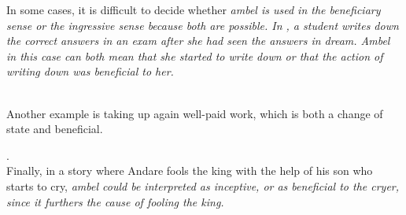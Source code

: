 In some cases, it is difficult to decide whether \em ambel \em is used in the beneficiary sense or the ingressive sense because both are possible.
In , a student writes down the correct answers in an exam after she had seen the answers in dream. \em Ambel \em in this case can both mean that she started to write down or that the action of writing down was beneficial to her.


 \\

Another example is taking up again well-paid work, which is both a change of state and beneficial.

. \\ 


Finally, in a story where Andare fools the king with the help of his son who starts to cry, \em ambel \em could be interpreted as inceptive, or as beneficial to the cryer, since it furthers the cause of fooling the king.


 \\

% 
% 
% 
% 
% 

